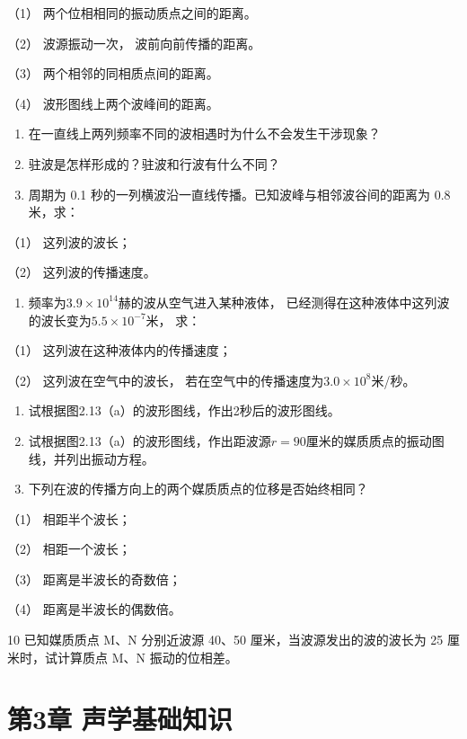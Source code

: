 （1） 两个位相相同的振动质点之间的距离。

（2） 波源振动一次， 波前向前传播的距离。

（3） 两个相邻的同相质点间的距离。

（4） 波形图线上两个波峰间的距离。

\begin{enumerate}
\def\labelenumi{\arabic{enumi}.}
\setcounter{enumi}{2}
\item
  在一直线上两列频率不同的波相遇时为什么不会发生干涉现象？
\item
  驻波是怎样形成的？驻波和行波有什么不同？
\item
  周期为 0.1 秒的一列横波沿一直线传播。已知波峰与相邻波谷间的距离为 0.8
  米，求：
\end{enumerate}

（1） 这列波的波长；

（2） 这列波的传播速度。

\begin{enumerate}
\def\labelenumi{\arabic{enumi}.}
\setcounter{enumi}{5}
\tightlist
\item
  频率为\(3.9 \times 10^{14}\)赫的波从空气进入某种液体，
  已经测得在这种液体中这列波的波长变为\(5.5 \times 10^{-7}\)米， 求：
\end{enumerate}

（1） 这列波在这种液体内的传播速度；

（2） 这列波在空气中的波长，
若在空气中的传播速度为\(3.0 \times 10^{8}\)米/秒。

\begin{enumerate}
\def\labelenumi{\arabic{enumi}.}
\setcounter{enumi}{6}
\item
  试根据图2.13（a）的波形图线，作出2秒后的波形图线。
\item
  试根据图2.13（a）的波形图线，作出距波源\(r=90\)厘米的媒质质点的振动图线，并列出振动方程。
\item
  下列在波的传播方向上的两个媒质质点的位移是否始终相同？
\end{enumerate}

（1） 相距半个波长；

（2） 相距一个波长；

（3） 距离是半波长的奇数倍；

（4） 距离是半波长的偶数倍。

10 已知媒质质点 M、N 分别近波源 40、50 厘米，当波源发出的波的波长为 25
厘米时，试计算质点 M、N 振动的位相差。

\chapter{第3章
声学基础知识}\label{ux7b2c3ux7ae0-ux58f0ux5b66ux57faux7840ux77e5ux8bc6}


